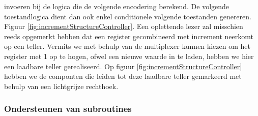 invoeren bij de logica die de volgende encodering berekend. De volgende toestandlogica dient dan ook enkel conditionele volgende toestanden genereren. Figuur \ref{fig:incrementStructureController}. Een oplettende lezer zal misschien reeds opgemerkt hebben dat een register gecombineerd met increment neerkomt op een teller. Vermits we met behulp van de multiplexer kunnen kiezen om het register met 1 op te hogen, ofwel een nieuwe waarde in te laden, hebben we hier een laadbare teller gerealiseerd. Op figuur \ref{fig:incrementStructureController} hebben we de componten die leiden tot deze laadbare teller gemarkeerd met behulp van een lichtgrijze rechthoek.
\subsubsection{Ondersteunen van subroutines}

